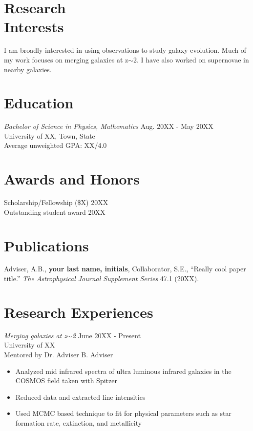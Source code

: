 \documentclass[resmargin, 10pt]{res} %
\begin{document}
\begin{resume}

	\section{Research \\Interests}

	I am broadly interested in using observations to study galaxy evolution.
	Much of my work focuses on merging galaxies at z$\sim$2. I have also worked on supernovae in nearby galaxies.

	\section{Education}

	 {\sl Bachelor of Science in Physics, Mathematics}  \hfill Aug. 20XX - May 20XX \\
	University of XX, Town, State\\
	\tabto{4em}Average unweighted GPA: XX/4.0

	\section{Awards and Honors}

	Scholarship/Fellowship (\$X)   \hfill 20XX\\
	Outstanding student award \hfill 20XX\\

	\section{Publications}

	\hangindent=0.7cm Adviser, A.B., \textbf{your last name, initials}, Collaborator, S.E., ``Really cool paper title.'' \emph{The Astrophysical Journal Supplement Series} 47.1 (20XX).


	\section{Research Experiences}

	 {\sl Merging galaxies at z$\sim$2} \hfill June 20XX - Present \\
	University of XX \\
	Mentored by Dr. Adviser B. Adviser
	\vspace{1mm}
	\begin{itemize}\itemsep -2pt
		\item Analyzed mid infrared spectra of ultra luminous infrared galaxies in the COSMOS field taken with Spitzer
		\item Reduced data and extracted line intensities
		\item Used MCMC based technique to fit for physical parameters such as star formation rate, extinction, and metallicity
	\end{itemize}


\end{resume}
\end{document}
